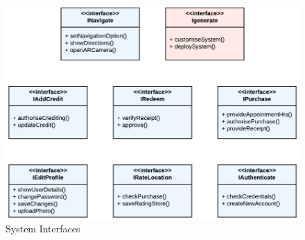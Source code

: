 \begin{figure}[!ht]
\centering
\includegraphics[scale=0.3]{img/System_Interfaces.png}
\caption{System Interfaces}
\label{fig:system_interfaces}
\end{figure}